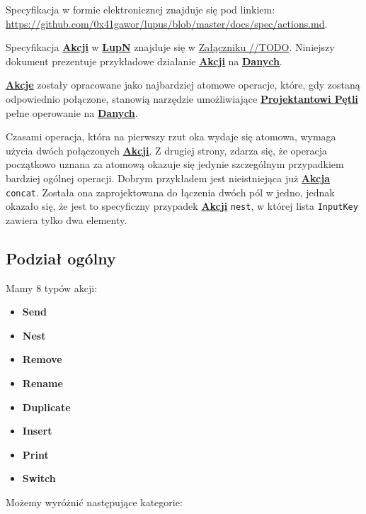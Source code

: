 \label{appendix:6}

Specyfikacja w formie elektronicznej znajduje się pod linkiem: \url{https://github.com/0x41gawor/lupus/blob/master/docs/spec/actions.md}.

Specyfikacja \hyperlink{def:akcja}{\textbf{Akcji}} w \hyperlink{def:lupn}{\textbf{LupN}} znajduje się w \hyperref[appendix://TODO]{Załączniku //TODO}. Niniejszy dokument prezentuje przykładowe działanie \hyperlink{def:akcja}{\textbf{Akcji}} na \hyperlink{def:dane}{\textbf{Danych}}.

\hyperlink{def:akcja}{\textbf{Akcje}} zostały opracowane jako najbardziej atomowe operacje, które, gdy zostaną odpowiednio połączone, stanowią narzędzie umożliwiające \hyperlink{def:projektant}{\textbf{Projektantowi Pętli}} pełne operowanie na \hyperlink{def:dane}{\textbf{Danych}}.

Czasami operacja, która na pierwszy rzut oka wydaje się atomowa, wymaga użycia dwóch połączonych \hyperlink{def:akcja}{\textbf{Akcji}}. Z drugiej strony, zdarza się, że operacja początkowo uznana za atomową okazuje się jedynie szczególnym przypadkiem bardziej ogólnej operacji. Dobrym przykładem jest nieistniejąca już \hyperlink{def:akcja}{\textbf{Akcja}} \texttt{concat}. Została ona zaprojektowana do łączenia dwóch pól w jedno, jednak okazało się, że jest to specyficzny przypadek \hyperlink{def:akcja}{\textbf{Akcji}} \texttt{nest}, w której lista \texttt{InputKey} zawiera tylko dwa elementy.

\subsection{Podział ogólny}

Mamy 8 typów akcji:

\begin{itemize}
    \item \textbf{Send}
    \item \textbf{Nest}
    \item \textbf{Remove}
    \item \textbf{Rename}
    \item \textbf{Duplicate}
    \item \textbf{Insert}
    \item \textbf{Print}
    \item \textbf{Switch}
\end{itemize}

Możemy wyróżnić następujące kategorie:

